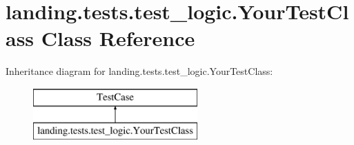 \hypertarget{classlanding_1_1tests_1_1test__logic_1_1YourTestClass}{}\section{landing.\+tests.\+test\+\_\+logic.\+Your\+Test\+Class Class Reference}
\label{classlanding_1_1tests_1_1test__logic_1_1YourTestClass}
Inheritance diagram for landing.\+tests.\+test\+\_\+logic.\+Your\+Test\+Class\+:\begin{figure}[H]
\begin{center}
\leavevmode
\includegraphics[height=2.000000cm]{classlanding_1_1tests_1_1test__logic_1_1YourTestClass}
\end{center}
\end{figure}

